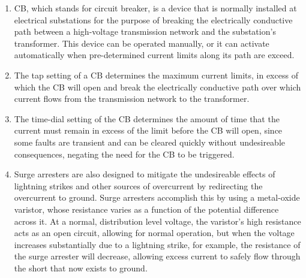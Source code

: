 \documentclass{article}
\begin{document}
\begin{enumerate}[label=\thesubsection]
	\setcounter{subsection}{24}
  \item CB, which stands for circuit breaker, is a device that is normally installed at electrical substations for the purpose of breaking the electrically conductive path between a high-voltage transmission network and the substation's transformer. This device can be operated manually, or it can activate automatically when pre-determined current limits along its path are exceed.
	\setcounter{subsection}{25}
  \item The tap setting of a CB determines the maximum current limits, in excess of which the CB will open and break the electrically conductive path over which current flows from the transmission network to the transformer. 
	\setcounter{subsection}{26}
	\item The time-dial setting of the CB determines the amount of time that the current must remain in excess of the limit before the CB will open, since some faults are transient and can be cleared quickly without undesireable consequences, negating the need for the CB to be triggered.
	\setcounter{subsection}{34}
	\item Surge arresters are also designed to mitigate the undesireable effects of lightning strikes and other sources of overcurrent by redirecting the overcurrent to ground. Surge arresters accomplish this by using a metal-oxide varistor, whose resistance varies as a function of the potential difference across it. At a normal, distribution level voltage, the varistor's high resistance acts as an open circuit, allowing for normal operation, but when the voltage increases substantially due to a lightning strike, for example, the resistance of the surge arrester will decrease, allowing excess current to safely flow through the short that now exists to ground.
\end{enumerate}
\end{document}
